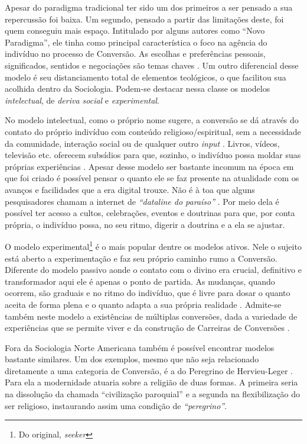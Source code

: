 \documentclass[
	12pt,				%
	oneside,			%
	a4paper,			%
	sumario=tradicional,
	english,			%
	brazil				%
	]{abntex2}
\begin{document}
Apesar do paradigma tradicional ter sido um dos primeiros a ser pensado a sua repercussão foi baixa. Um segundo, pensado a partir das limitações deste, foi quem conseguiu mais espaço. Intitulado por alguns autores como ``Novo Paradigma'', ele tinha como principal característica o foco na agência do indivíduo no processo de Conversão. As escolhas e preferências pessoais, significados, sentidos e negociações são temas chaves \autocite[02]{kilbourne_paradigm_1989}. Um outro diferencial desse modelo é seu distanciamento total de elementos teológicos, o que facilitou sua acolhida dentro da Sociologia. Podem-se destacar nessa classe os modelos \emph{intelectual}, de \emph{deriva social} e \emph{experimental}.

No modelo intelectual, como o próprio nome sugere, a conversão se dá através do contato do próprio indivíduo com conteúdo religioso/espiritual, sem a necessidade da comunidade, interação social ou de qualquer outro \emph{input} \autocite[376]{lofland_conversion_1981}. Livros, vídeos, televisão etc. oferecem subsídios para que, sozinho, o indivíduo possa moldar suas próprias experiências \autocite[377]{lofland_conversion_1981}. Apesar desse modelo ser bastante incomum na época em que foi criado é possível pensar o quanto ele se faz presente na atualidade com os avanços e facilidades que a era digital trouxe. Não é à toa que alguns pesquisadores chamam a internet de \emph{``dataline do paraíso''} \autocite[86]{george_religion_2006}. Por meio dela é possível ter acesso a cultos, celebrações, eventos e doutrinas para que, por conta própria, o indivíduo possa, no seu ritmo, digerir a doutrina e a ela se ajustar.

O modelo experimental\footnote{Do original, \emph{seeker}} é o mais popular dentre os modelos ativos. Nele o sujeito está aberto a experimentação e faz seu próprio caminho rumo a Conversão. Diferente do modelo passivo aonde o contato com o divino era crucial, definitivo e transformador aqui ele é apenas o ponto de partida. As mudanças, quando ocorrem, são graduais e no ritmo do indivíduo, que é livre para dosar o quanto aceita de forma plena e o quanto adapta a sua própria realidade \autocites[06]{kilbourne_paradigm_1989}[346]{gooren_reassessing_2007-1}. Admite-se também neste modelo a existências de múltiplas conversões, dada a variedade de experiências que se permite viver e da construção de Carreiras de Conversões \autocite[172]{richardson_active_1985}.

Fora da Sociologia Norte Americana também é possível encontrar modelos bastante similares. Um dos exemplos, mesmo que não seja relacionado diretamente a uma categoria de Conversão, é a do Peregrino de Hervieu-Leger \autocite*{hervieu-leger_peregrino_2015}. Para ela a modernidade atuaria sobre a religião de duas formas. A primeira seria na dissolução da chamada ``civilização paroquial'' e a segunda na flexibilização do ser religioso, instaurando assim uma condição de \emph{``peregrino''}.
\end{document}
